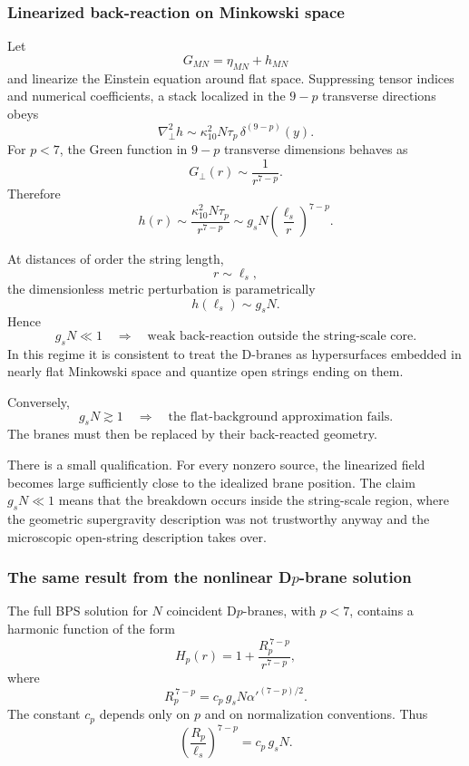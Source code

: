 \documentclass[
  10pt,
  a4paper,
  openany]{book}
\begin{document}
\subsubsection{Linearized back-reaction on Minkowski
space}\label{linearized-back-reaction-on-minkowski-space}

Let \[
G_{MN}=\eta_{MN}+h_{MN}
\] and linearize the Einstein equation around flat space. Suppressing
tensor indices and numerical coefficients, a stack localized in the
\(9-p\) transverse directions obeys \[
\nabla_\perp^2h
\sim
\kappa_{10}^2N\tau_p\,
\delta^{(9-p)}(y).
\] For \(p<7\), the Green function in \(9-p\) transverse dimensions
behaves as \[
G_\perp(r)\sim\frac1{r^{7-p}}.
\] Therefore \[
h(r)
\sim
\frac{\kappa_{10}^2N\tau_p}{r^{7-p}}
\sim
g_sN
\left(\frac{\ell_s}{r}\right)^{7-p}.
\]

At distances of order the string length, \[
r\sim\ell_s,
\] the dimensionless metric perturbation is parametrically \[
h(\ell_s)\sim g_sN.
\] Hence \[
\boxed{
g_sN\ll1
\quad\Longrightarrow\quad
\text{weak back-reaction outside the string-scale core}
}.
\] In this regime it is consistent to treat the D-branes as
hypersurfaces embedded in nearly flat Minkowski space and quantize open
strings ending on them.

Conversely, \[
\boxed{
g_sN\gtrsim1
\quad\Longrightarrow\quad
\text{the flat-background approximation fails}
}.
\] The branes must then be replaced by their back-reacted geometry.

There is a small qualification. For every nonzero source, the linearized
field becomes large sufficiently close to the idealized brane position.
The claim \(g_sN\ll1\) means that the breakdown occurs inside the
string-scale region, where the geometric supergravity description was
not trustworthy anyway and the microscopic open-string description takes
over.

\subsubsection{\texorpdfstring{The same result from the nonlinear
D\(p\)-brane
solution}{The same result from the nonlinear Dp-brane solution}}\label{the-same-result-from-the-nonlinear-dp-brane-solution}

The full BPS solution for \(N\) coincident D\(p\)-branes, with \(p<7\),
contains a harmonic function of the form \[
H_p(r)
=1+\frac{R_p^{\,7-p}}{r^{7-p}},
\] where \[
R_p^{\,7-p}
=c_p\,g_sN\alpha'^{(7-p)/2}.
\] The constant \(c_p\) depends only on \(p\) and on normalization
conventions. Thus \[
\left(\frac{R_p}{\ell_s}\right)^{7-p}
=c_p\,g_sN.
\]
\end{document}
